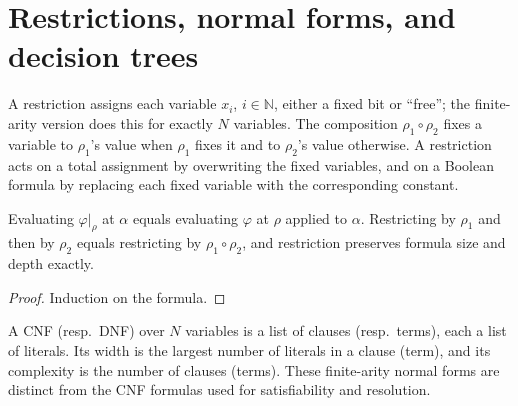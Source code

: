 \section{Restrictions, normal forms, and decision trees}
\label{sec:lowerbounds-restrictions}

\begin{definition}[Restriction]
  \label{def:lowerbounds-restriction}
  \leanok
  A restriction assigns each variable $x_i$, $i \in \mathbb{N}$, either a
  fixed bit or ``free''; the finite-arity version does this for exactly $N$
  variables. The composition $\rho_1 \circ \rho_2$ fixes a variable to
  $\rho_1$'s value when $\rho_1$ fixes it and to $\rho_2$'s value otherwise.
  A restriction acts on a total assignment by overwriting the fixed variables,
  and on a Boolean formula by replacing each fixed variable with the
  corresponding constant.
\end{definition}

\begin{lemma}
  \label{lem:lowerbounds-restrict}
  \leanok
  Evaluating $\varphi|_\rho$ at $\alpha$ equals evaluating $\varphi$ at
  $\rho$ applied to $\alpha$. Restricting by $\rho_1$ and then by $\rho_2$
  equals restricting by $\rho_1 \circ \rho_2$, and restriction preserves
  formula size and depth exactly.
\end{lemma}
\begin{proof}
  \leanok
  Induction on the formula.
\end{proof}

\begin{definition}
  \label{def:lowerbounds-normal-forms}
  \leanok
  A CNF (resp.\ DNF) over $N$ variables is a list of clauses (resp.\ terms),
  each a list of literals. Its width is the largest number of literals in a
  clause (term), and its complexity is the number of clauses (terms). These
  finite-arity normal forms are distinct from the CNF formulas used for
  satisfiability and resolution.
\end{definition}

